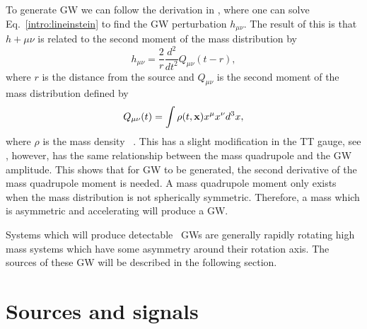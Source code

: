 To generate \gls{GW} we can follow the derivation in \citep{flanagan2005BasicsGravitational}, where one can solve Eq.~\ref{intro:lineinstein} to find the \gls{GW} perturbation $h_{\mu \nu}$.
The result of this is that $h+{\mu \nu}$ is related to the second moment of the mass distribution by
\begin{equation}
    \label{intro:gravwave:amp}
        h_{\mu \nu} = \frac{2}{r}  \frac{d^2}{dt^2} Q_{\mu \nu}(t-r),
\end{equation}
where $r$ is the distance from the source \citep{letiec2016TheoryGravitational} and $Q_{\mu \nu}$ is the second moment of the mass distribution defined by 
\begin{equation}
    Q_{\mu \nu}(t) = \int \rho(t,{\bf x}) x^\mu x^\nu d^3x,
\end{equation}
where $\rho$ is the mass density ~\citep{flanagan2005BasicsGravitational}.  
This has a slight modification in the TT gauge, see
\citep{flanagan2005BasicsGravitational}, however, has the same relationship
between the mass quadrupole and the \gls{GW} amplitude.  This shows that for
\gls{GW} to be generated, the second derivative of the mass quadrupole moment
is needed.  A mass quadrupole moment only exists when the mass distribution is
not spherically symmetric.  Therefore, a mass which is asymmetric and
accelerating will produce a \gls{GW}.~

Systems which will produce detectable~
\glspl{GW} are generally rapidly rotating high~ mass systems which have some
asymmetry around their rotation axis.  The sources of these \gls{GW} will be
described in the following section.~



\section{\label{intro:sources}Sources and signals}

